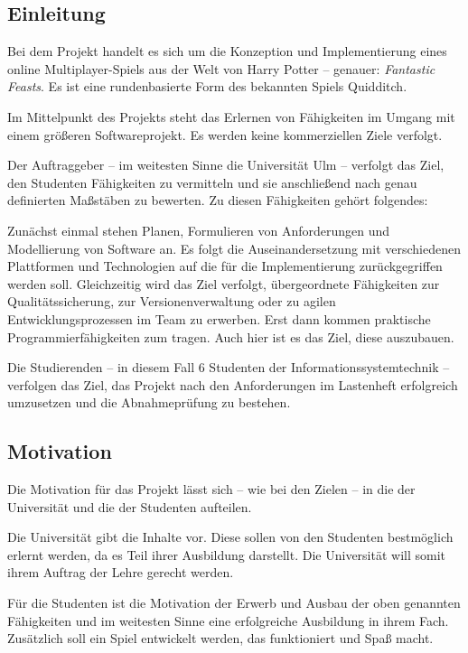 \subsection{Einleitung}
Bei dem Projekt handelt es sich um die Konzeption und Implementierung eines online Multiplayer-Spiels aus der Welt von Harry Potter – genauer: \textit{Fantastic Feasts}. Es ist eine rundenbasierte Form des bekannten Spiels Quidditch.


Im Mittelpunkt des Projekts steht das Erlernen von Fähigkeiten im Umgang mit einem größeren Softwareprojekt. Es werden keine kommerziellen Ziele verfolgt.

Der Auftraggeber – im weitesten Sinne die Universität Ulm – verfolgt das Ziel, den Studenten Fähigkeiten zu vermitteln und sie anschließend nach genau definierten Maßstäben zu bewerten. Zu diesen Fähigkeiten gehört folgendes:

Zunächst einmal stehen Planen, Formulieren von Anforderungen und Modellierung von Software an. Es folgt die Auseinandersetzung mit verschiedenen Plattformen und Technologien auf die für die Implementierung zurückgegriffen werden soll. Gleichzeitig wird das Ziel verfolgt, übergeordnete Fähigkeiten zur Qualitätssicherung, zur Versionenverwaltung oder zu agilen Entwicklungsprozessen im Team zu erwerben. 
Erst dann kommen praktische Programmierfähigkeiten zum tragen. Auch hier ist es das Ziel, diese auszubauen.

Die Studierenden – in diesem Fall 6 Studenten der Informationssystemtechnik – verfolgen das Ziel, das Projekt nach den Anforderungen im Lastenheft erfolgreich umzusetzen und die Abnahmeprüfung zu bestehen.





\subsection{Motivation}
Die Motivation für das Projekt lässt sich – wie bei den Zielen – in die der Universität und die der Studenten aufteilen.

Die Universität gibt die Inhalte vor. Diese sollen von den Studenten bestmöglich erlernt werden, da es Teil ihrer Ausbildung darstellt. Die Universität will somit ihrem Auftrag der Lehre gerecht werden.
 

Für die Studenten ist die Motivation der Erwerb und Ausbau der oben genannten Fähigkeiten und im weitesten Sinne eine erfolgreiche Ausbildung in ihrem Fach. Zusätzlich soll ein Spiel entwickelt werden, das funktioniert und Spaß macht.
 

